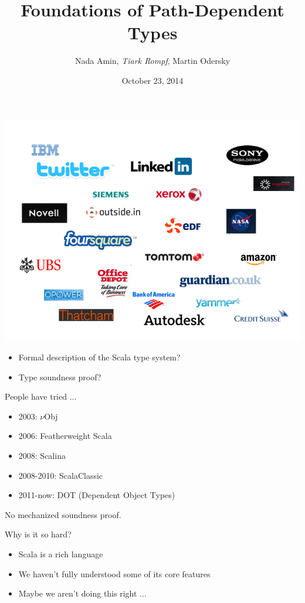 \documentclass{beamer}
\title{Foundations of Path-Dependent Types}
\author{Nada Amin, {\it Tiark Rompf}, Martin Odersky}
\institute{OOPSLA}
\date{October 23, 2014}
\begin{document}
\frame{\titlepage}

\begin{frame}[fragile]
\includegraphics[width=\textwidth]{industry.png}
\end{frame}

\begin{frame}[fragile]
\begin{itemize}
\item Formal description of the Scala type system?
\item Type soundness proof?
\end{itemize}
\end{frame}


\begin{frame}[fragile]{People have tried ...}
\begin{itemize}
\item 2003: $\nu$Obj
\item 2006: Featherweight Scala
\item 2008: Scalina
\item 2008-2010: ScalaClassic
\item 2011-now: DOT (Dependent Object Types)
\end{itemize}
No mechanized soundness proof.
\end{frame}


\begin{frame}[fragile]{Why is it so hard?}
\begin{itemize}
\item Scala is a rich language
\item We haven't fully understood some of its core features
\item Maybe we aren't doing this right ...
\end{itemize}
\end{frame}
\end{document}
